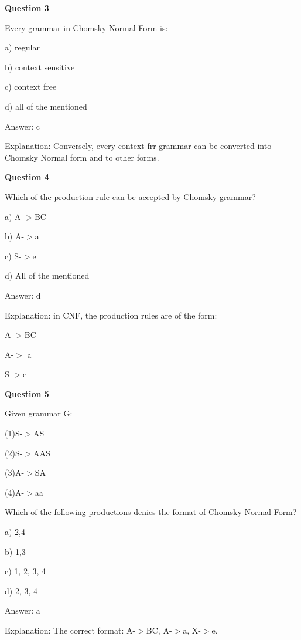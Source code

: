 \documentclass{article}
\begin{document}
\begin{mdframed}[linewidth=1pt, roundcorner=5pt, linecolor=gray!30, backgroundcolor=gray!5]
\textbf{Question 3} 

Every grammar in Chomsky Normal Form is:

a) regular

b) context sensitive

c) context free

d) all of the mentioned
\vspace{5pt} \par
\begin{tcolorbox}[colback=green!5, colframe=green!40!black, title=Solution]
Answer: c

Explanation: Conversely, every context frr grammar can be converted into Chomsky Normal form and to other forms.
\end{tcolorbox}
\end{mdframed}
\newpage

\begin{mdframed}[linewidth=1pt, roundcorner=5pt, linecolor=gray!30, backgroundcolor=gray!5]
\textbf{Question 4} 

Which of the production rule can be accepted by Chomsky grammar?

a) A-$>$BC

b) A-$>$a

c) S-$>$e

d) All of the mentioned
\vspace{5pt} \par
\begin{tcolorbox}[colback=green!5, colframe=green!40!black, title=Solution]
Answer: d

Explanation: in CNF, the production rules are of the form:

A-$>$BC

A-$>$ a

S-$>$e
\end{tcolorbox}
\end{mdframed}

\begin{mdframed}[linewidth=1pt, roundcorner=5pt, linecolor=gray!30, backgroundcolor=gray!5]
\textbf{Question 5} 

Given grammar G:

(1)S-$>$AS

(2)S-$>$AAS

(3)A-$>$SA

(4)A-$>$aa

Which of the following productions denies the format of Chomsky Normal Form?

a) 2,4

b) 1,3

c) 1, 2, 3, 4

d) 2, 3, 4
\vspace{5pt} \par
\begin{tcolorbox}[colback=green!5, colframe=green!40!black, title=Solution]
Answer: a

Explanation: The correct format: A-$>$BC, A-$>$a, X-$>$e.
\end{tcolorbox}
\end{mdframed}
\end{document}
